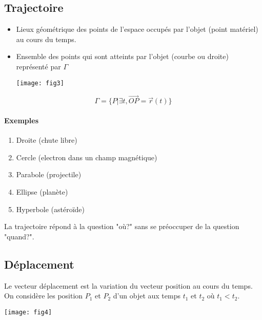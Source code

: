 \documentclass[
    11pt,
    a4paper,
    oneside,
    headinlcude, footinclude,
    twoside,
]{report}
\renewcommand{\vec}[1]{\overrightarrow{#1}}
\begin{document}
\subsection{Trajectoire}
\label{sub:trajectoire}

\begin{itemize}
\item Lieux géométrique des points de l'espace occupés par l'objet (point
matériel) au cours du temps.

\pagebreak

\item Ensemble des points qui sont atteints par l'objet (courbe ou droite)
représenté par $\Gamma$

\begin{center}
\texttt{[image: fig3]}
\end{center}
\end{itemize}


$$\Gamma = \{ P | \exists t, \vec{OP} = \vec r (t)\}$$

\paragraph{Exemples}
\label{par:exemples}

\begin{enumerate}
\item Droite (chute libre)
\item Cercle (electron dans un champ magnétique)
\item Parabole (projectile)
\item Ellipse (planète)
\item Hyperbole (astéroïde)
\end{enumerate}

La trajectoire répond à la question "où?" sans se préoccuper de la question
"quand?".

\pagebreak

\subsection{Déplacement}
\label{sub:deplacement}

Le vecteur déplacement est la variation du vecteur position au cours du temps.
On considère les position $P_{1}$ et $P_{2}$ d'un objet aux temps $t_{1}$ et $t_{2}$
où $t_{1} < t_{2}$.

\begin{center}
\texttt{[image: fig4]}
\end{center}
\end{document}
